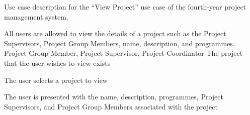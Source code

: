 \begin{table}
  \centering
  \caption{Use case description for the ``View Project'' use case of the fourth-year project management system.}
  \label{tbl:use-case-view-project}

  \begin{usecase}
    All users are allowed to view the details of a project such as the Project Supervisors, Project Group Members, name, description, and programmes.
    Project Group Member, Project Supervisor, Project Coordinator
    The project that the user wishes to view exists
    \ucnormal
    \begin{ucenum}
      \item The user selects a project to view
      \item The user is presented with the name, description, programmes, Project Supervisors, and Project Group Members associated with the project
    \end{ucenum}
  \end{usecase}
\end{table}


